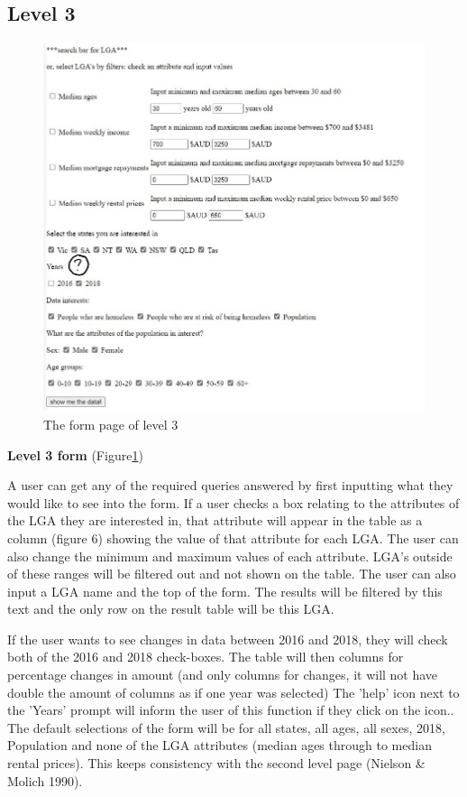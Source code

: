 \documentclass[12pt, a4paper]{article}
\begin{document}
\subsection{Level 3}
\begin{figure}[h]
\centering
\includegraphics[scale=.9]{level3form.jpeg} 
\caption{The form page of level 3}
\label{fig:3form}
\end{figure}
\textbf{Level 3 form} (Figure\ref{fig:3form})

A user can get any of the required queries answered by first inputting what they would like to see into the form. If a user checks a box relating to the attributes of the LGA they are interested in, that attribute will appear in the table as a column (figure 6) showing the value of that attribute for each LGA. The user can also change the minimum and maximum values of each attribute. LGA's outside of these ranges will be filtered out and not shown on the table. The user can also input a LGA name and the top of the form. The results will be filtered by this text and the only row on the result table will be this LGA. 

If the user wants to see changes in data between 2016 and 2018, they will check both of the 2016 and 2018 check-boxes.  The table will then columns for percentage changes in amount (and only columns for changes, it will not have double the amount of columns as if one year was selected) The 'help' icon next to the 'Years' prompt will inform the user of this function if they click on the icon..
The default selections of the form will be for all states, all ages, all sexes, 2018, Population and none of the LGA attributes (median ages through to median rental prices). This keeps consistency with the second level page (Nielson \& Molich 1990).
 
\end{document}
